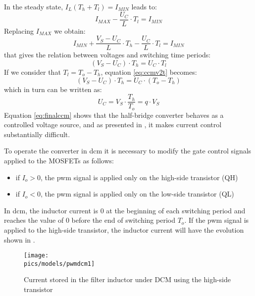In the steady state, $I_L(T_h + T_l) = I_{MIN}$ leads to:
\begin{equation}
    I_{MAX} - \frac{U_C}{L} \cdot T_l = I_{MIN}
\end{equation}
Replacing $I_{MAX}$ we obtain:
\begin{equation}
    I_{MIN} + \frac{V_S - U_C}{L} \cdot T_h - \frac{U_C}{L} \cdot T_l = I_{MIN}
\end{equation}
that gives the relation between voltages and switching time periods:
\begin{equation}
    \label{eq:ccmv2t}
    (V_S - U_C) \cdot T_h = U_C \cdot T_l
\end{equation}
If we consider that $T_l = T_o - T_h$, equation \eqref{eq:ccmv2t} becomes:
\begin{equation}
    (V_S - U_C) \cdot T_h = U_C \cdot (T_o - T_h)
\end{equation}
which in turn can be written as:
\begin{equation}
    \label{eq:finalccm}
    U_C = V_S \cdot \frac{T_h}{T_o} = q \cdot V_S
\end{equation}
Equation \eqref{eq:finalccm} shows that the half-bridge converter behaves as a controlled voltage source, and as presented in , it makes current control substantially difficult.

To operate the converter in \gls{dcm} it is necessary to modify the gate control signals applied to the MOSFETs as follows:
\begin{itemize}
    \item if $I_o > 0$, the \gls{pwm} signal is applied only on the high-side transistor (QH)
    \item if $I_o < 0$, the \gls{pwm} signal is applied only on the low-side transistor (QL)
\end{itemize}
In \gls{dcm}, the inductor current is 0 at the beginning of each switching period and reaches the value of 0 before the end of switching period $T_o$.
If the \gls{pwm} signal is applied to the high-side transistor, the inductor current will have the evolution shown in .

\begin{figure}[!ht]
    \begin{center}\texttt{[image: \\pics/models/pwmdcm1]}\end{center}
    \caption{Current stored in the filter inductor under DCM using the high-side transistor}
    \label{fig:pwmdcm1}
\end{figure}

